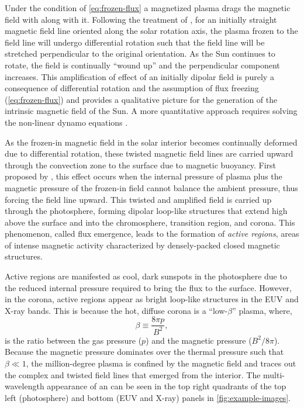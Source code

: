 Under the condition of \autoref{eq:frozen-flux} a magnetized plasma drags the magnetic field with along with it. Following the treatment of \citet{golub_solar_2010}, for an initially straight magnetic field line oriented along the solar rotation axis, the plasma frozen to the field line will undergo differential rotation such that the field line will be stretched perpendicular to the original orientation. As the Sun continues to rotate, the field is continually ``wound up'' and the perpendicular component increases. This amplification of effect of an initially dipolar field is purely a consequence of differential rotation and the assumption of flux freezing (\autoref{eq:frozen-flux}) and provides a qualitative picture for the generation of the intrinsic magnetic field of the Sun. A more quantitative approach requires solving the non-linear dynamo equations \citep[see Section 4.3.3 of][]{golub_solar_2010}.

As the frozen-in magnetic field in the solar interior becomes continually deformed due to differential rotation, these twisted magnetic field lines are carried upward through the convection zone to the surface due to magnetic buoyancy. First proposed by \citet{parker_formation_1955}, this effect occurs when the internal pressure of plasma plus the magnetic pressure of the frozen-in field cannot balance the ambient pressure, thus forcing the field line upward. This twisted and amplified field is carried up through the photosphere, forming dipolar loop-like structures that extend high above the surface and into the chromosphere, transition region, and corona. This phenomenon, called flux emergence, leads to the formation of \textit{active regions}, areas of intense magnetic activity characterized by densely-packed closed magnetic structures.

Active regions are manifested as cool, dark sunspots in the photosphere due to the reduced internal pressure required to bring the flux to the surface. However, in the corona, active regions appear as bright loop-like structures in the EUV and X-ray bands. This is because the hot, diffuse corona is a ``low-$\beta$'' plasma, where,
\begin{equation}\label{eq:plasma-beta}
    \beta\equiv\frac{8\pi p}{B^2},
\end{equation}
is the ratio between the gas pressure ($p$) and the magnetic pressure ($B^2/8\pi$). Because the magnetic pressure dominates over the thermal pressure such that $\beta\ll1$, the million-degree plasma is confined by the magnetic field and traces out the complex and twisted field lines that emerged from the interior. The multi-wavelength appearance of an \AR{} can be seen in the top right quadrants of the top left (photosphere) and bottom (EUV and X-ray) panels in \autoref{fig:example-images}.

